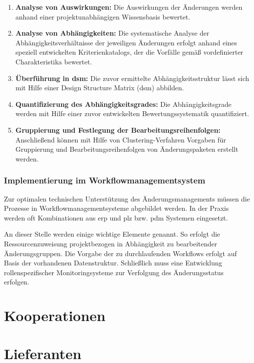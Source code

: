 \begin{enumerate}
 \item \textbf{Analyse von Auswirkungen: }
 Die Auswirkungen der Änderungen werden anhand einer projektunabhängigen Wissensbasis bewertet. 
 \item \textbf{Analyse von Abhängigkeiten: }
Die systematische Analyse der Abhängigkeitsverhältnisse der jeweiligen Änderungen erfolgt anhand eines speziell entwickelten Kriterienkatalogs, der die Vorfälle gemäß vordefinierter Charakteristika bewertet. 
\item \textbf{Überführung in \gls{dsm}: }
Die zuvor ermittelte Abhängigkeitsstruktur lässt sich mit Hilfe einer Design Structure Matrix (\gls{dsm}) abbilden. 
 \item \textbf{Quantifizierung des Abhängigkeitsgrades: }
 Die Abhängigkeitsgrade werden mit Hilfe einer zuvor entwickelten Bewertungssystematik quantifiziert.
 \item \textbf{Gruppierung und Festlegung der Bearbeitungsreihenfolgen: }
 Anschließend können mit Hilfe von Clustering-Verfahren Vorgaben für Gruppierung und Bearbeitungsreihenfolgen von Änderungspaketen erstellt werden. 
\end{enumerate}

\subsubsection*{Implementierung im Workflowmanagementsystem}
Zur optimalen technischen Unterstützung des Änderungsmanagements müssen die Prozesse in Workflowmanagementsysteme abgebildet werden. In der Praxis werden oft Kombinationen aus \gls{erp} und \gls{plz} bzw. \gls{pdm} Systemen eingesetzt. 

An dieser Stelle werden einige wichtige Elemente genannt. So erfolgt die Ressourcenzuweisung projektbezogen in Abhängigkeit zu bearbeitender Änderungsgruppen. Die Vorgabe der zu durchlaufenden Workflows erfolgt auf Basis der vorhandenen Datenstruktur. Schließlich muss eine Entwicklung rollenspezifischer Monitoringsysteme zur Verfolgung des Änderungsstatus erfolgen. 



\section{Kooperationen}

\section{Lieferanten}

